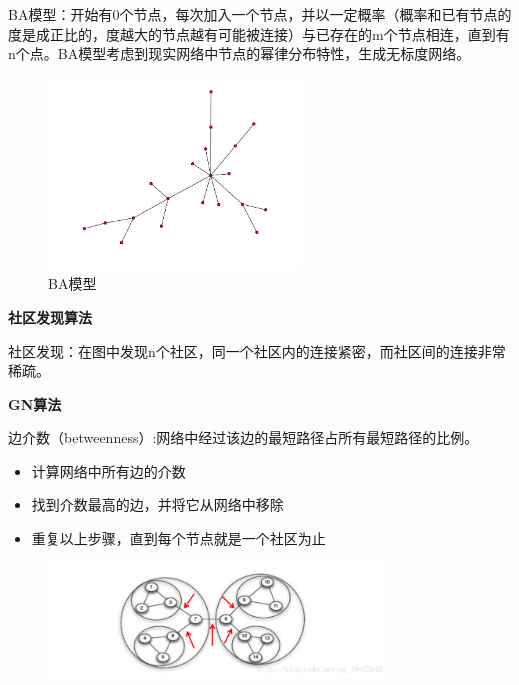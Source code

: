 \begin{frame}
	BA模型：开始有0个节点，每次加入一个节点，并以一定概率（概率和已有节点的度是成正比的，度越大的节点越有可能被连接）与已存在的m个节点相连，直到有n个点。BA模型考虑到现实网络中节点的幂律分布特性，生成无标度网络。
	\begin{figure}[htbp]
		\centering
		\includegraphics[width=0.6\textwidth]{pic/BA.png}
		\caption{BA模型}
	\end{figure}
\end{frame}
\begin{frame}
	\textbf{社区发现算法}
	
	社区发现：在图中发现n个社区，同一个社区内的连接紧密，而社区间的连接非常稀疏。
\end{frame}

\begin{frame}
	\textbf{GN算法}
	
	边介数（betweenness）:网络中经过该边的最短路径占所有最短路径的比例。
	\begin{itemize}
		\item 计算网络中所有边的介数
		\item 找到介数最高的边，并将它从网络中移除 
		\item 重复以上步骤，直到每个节点就是一个社区为止
	\end{itemize}
	
	\begin{figure}[htbp]
		\centering
		\includegraphics[width=0.8\textwidth]{pic/GN.png}
	\end{figure}
\end{frame}

